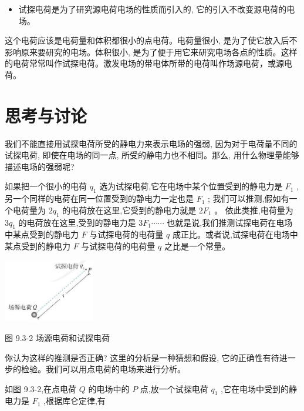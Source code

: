 \documentclass[10pt]{article}
\begin{document}
\begin{mdframed}

\begin{itemize}
\item 试探电荷是为了研究源电荷电场的性质而引入的, 它的引入不改变源电荷的电场。
\end{itemize}

\end{mdframed}

这个电荷应该是电荷量和体积都很小的点电荷。电荷量很小, 是为了使它放入后不影响原来要研究的电场。体积很小, 是为了便于用它来研究电场各点的性质。这样的电荷常常叫作试探电荷。激发电场的带电体所带的电荷叫作场源电荷，或源电荷。

\section*{思考与讨论}

我们不能直接用试探电荷所受的静电力来表示电场的强弱, 因为对于电荷量不同的试探电荷, 即使在电场的同一点, 所受的静电力也不相同。那么, 用什么物理量能够描述电场的强弱呢?

如果把一个很小的电荷 \({q}_{1}\) 选为试探电荷,它在电场中某个位置受到的静电力是 \({F}_{1}\) ,另一个同样的电荷在同一位置受到的静电力一定也是 \({F}_{1}\) ; 我们可以推测,假如有一个电荷量为 \(2{q}_{1}\) 的电荷放在这里,它受到的静电力就是 \(2{F}_{1}\) 。 依此类推,电荷量为 \(3{q}_{1}\) 的电荷放在这里,受到的静电力是 \(3{F}_{1}\cdots \cdots\) 也就是说,我们推测试探电荷在电场中某点受到的静电力 \(F\) 与试探电荷的电荷量 \(q\) 成正比。或者说,试探电荷在电场中某点受到的静电力 \(F\) 与试探电荷的电荷量 \(q\) 之比是一个常量。

\begin{center}
\includegraphics[max width=0.3\textwidth]{images/01911d5f-8e38-70c0-b5b8-2b399bd115b6_17_786650.jpg}
\end{center}

图 9.3-2 场源电荷和试探电荷

你认为这样的推测是否正确? 这里的分析是一种猜想和假设, 它的正确性有待进一步的检验。我们可以用点电荷的电场来进行分析。

如图 9.3-2,在点电荷 \(Q\) 的电场中的 \(P\) 点,放一个试探电荷 \({q}_{1}\) ,它在电场中受到的静电力是 \({F}_{1}\) ,根据库仑定律,有
\end{document}
